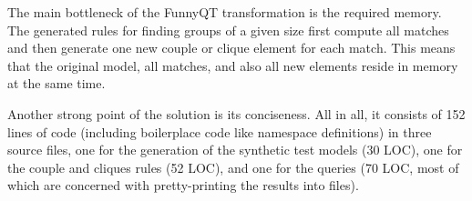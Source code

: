 \documentclass[submission]{eptcs}
\begin{document}
The main bottleneck of the FunnyQT transformation is the required memory.  The
generated rules for finding groups of a given size first compute all matches
and then generate one new couple or clique element for each match.  This means
that the original model, all matches, and also all new elements reside in
memory at the same time.

Another strong point of the solution is its conciseness.  All in all, it
consists of 152 lines of code (including boilerplace code like namespace
definitions) in three source files, one for the generation of the synthetic
test models (30 LOC), one for the couple and cliques rules (52 LOC), and one
for the queries (70 LOC, most of which are concerned with pretty-printing the
results into files).




\end{document}

